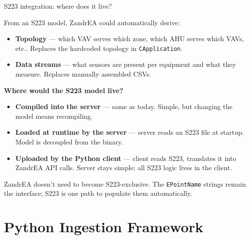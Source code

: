 \documentclass[aspectratio=169]{beamer}
\begin{document}
\begin{frame}{S223 integration: where does it live?}

\small From an S223 model, ZandrEA could automatically derive:
\begin{itemize}\setlength{\itemsep}{1pt}
  \item \textbf{Topology} --- which VAV serves which zone, which AHU serves which VAVs, etc.. Replaces the hardcoded topology in \texttt{CApplication}.
  \item \textbf{Data streams} --- what sensors are present per equipment and what they measure. Replaces manually assembled CSVs.
\end{itemize}

\vspace{0.1em}
\small\textbf{Where would the S223 model live?}
\begin{itemize}\setlength{\itemsep}{1pt}
  \item \textbf{Compiled into the server} --- same as today. Simple, but changing the model means recompiling.
  \item \textbf{Loaded at runtime by the server} --- server reads an S223 file at startup. Model is decoupled from the binary.
  \item \textbf{Uploaded by the Python client} --- client reads S223, translates it into ZandrEA API calls. Server stays simple; all S223 logic lives in the client.
\end{itemize}

\small ZandrEA doesn't need to become S223-exclusive. The \texttt{EPointName} strings remain the interface; S223 is one path to populate them automatically.

\end{frame}

\section{Python Ingestion Framework}
\end{document}
